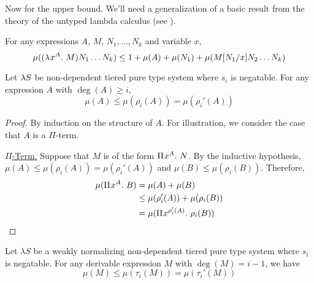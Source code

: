 \documentclass{article}
\begin{document}
Now for the upper bound.
We'll need a generalization of a basic result from the theory of the untyped lambda calculus (see \cite{xi-1997}).

\begin{lemma}
\label{lem:mu-upper-bound}
For any expressions $A$, $M$, $N_1, \dots, N_k$ and variable $x$,
\[
    \mu((\lambda^{} x^{A}. \ M) N_1 \dots N_k) \leq 1 + \mu(A) + \mu(N_1) + \mu(M[N_1/x] N_2 \dots N_k)
\]
\end{lemma}

\begin{lemma}\label{lem:mu-rho}
Let $\lambda S$ be non-dependent tiered pure type system where $s_i$ is negatable.
For any expression $A$ with $\deg(A) \geq i$,
\[
    \mu(A) \leq \mu(\rho_i(A)) = \mu(\rho_i'(A))
\]
\end{lemma}

\begin{proof}
By induction on the structure of $A$.
For illustration, we consider the case that $A$ is a $\Pi$-term.

\noindent\underline{$\Pi$-Term.}
Suppose that $M$ is of the form ${\Pi^{} {x}^{A}. \ {N}}$.
By the inductive hypothesis, $\mu(A) \leq \mu(\rho_i(A)) = \mu(\rho_i'(A))$ and $\mu(B) \leq \mu(\rho_i(B))$. Therefore,
\begin{align*}
\mu({\Pi^{} {x}^{A}. \ {B}}) &=
\mu(A) + \mu(B) \\ &\leq
\mu(\rho_i'(A)) + \mu(\rho_i(B)) \\ &=
\mu({\Pi^{} {x}^{\rho_i'(A)}. \ {\rho_i(B)}})
\end{align*}
\end{proof}

\begin{lemma}\label{lem:mu-tau}
Let $\lambda S$ be a weakly normalizing non-dependent tiered pure type system where $s_i$ is negatable.
For any derivable expression $M$ with $\deg(M) = i - 1$, we have
\[
    \mu(M) \leq \mu(\tau_i(M)) = \mu(\tau_i'(M))
\]
\end{lemma}
\end{document}
